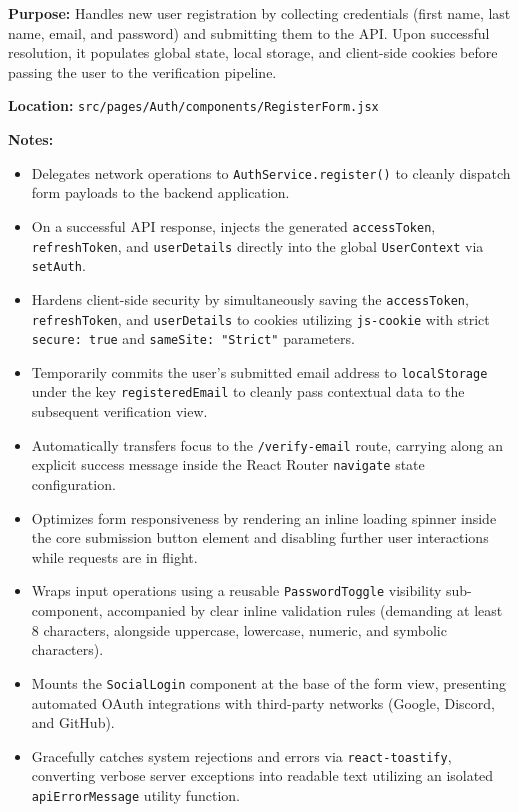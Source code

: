 \textbf{Purpose:} Handles new user registration by collecting credentials (first name, last name, email, and password) and submitting them to the API. Upon successful resolution, it populates global state, local storage, and client-side cookies before passing the user to the verification pipeline.

\vspace{0.2cm}
\noindent\textbf{Location:} \texttt{src/pages/Auth/components/RegisterForm.jsx}

\vspace{0.2cm}
\noindent\textbf{Notes:}
\begin{itemize}
    \item Delegates network operations to \texttt{AuthService.register()} to cleanly dispatch form payloads to the backend application.
    \item On a successful API response, injects the generated \texttt{accessToken}, \texttt{refreshToken}, and \texttt{userDetails} directly into the global \texttt{UserContext} via \texttt{setAuth}.
    \item Hardens client-side security by simultaneously saving the \texttt{accessToken}, \texttt{refreshToken}, and \texttt{userDetails} to cookies utilizing \texttt{js-cookie} with strict \texttt{secure: true} and \texttt{sameSite: "Strict"} parameters.
    \item Temporarily commits the user's submitted email address to \texttt{localStorage} under the key \texttt{registeredEmail} to cleanly pass contextual data to the subsequent verification view.
    \item Automatically transfers focus to the \texttt{/verify-email} route, carrying along an explicit success message inside the React Router \texttt{navigate} state configuration.
    \item Optimizes form responsiveness by rendering an inline loading spinner inside the core submission button element and disabling further user interactions while requests are in flight.
    \item Wraps input operations using a reusable \texttt{PasswordToggle} visibility sub-component, accompanied by clear inline validation rules (demanding at least 8 characters, alongside uppercase, lowercase, numeric, and symbolic characters).
    \item Mounts the \texttt{SocialLogin} component at the base of the form view, presenting automated OAuth integrations with third-party networks (Google, Discord, and GitHub).
    \item Gracefully catches system rejections and errors via \texttt{react-toastify}, converting verbose server exceptions into readable text utilizing an isolated \texttt{apiErrorMessage} utility function.
\end{itemize}

